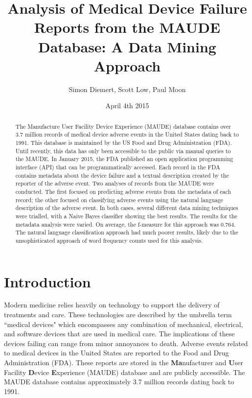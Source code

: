 \documentclass[11pt, notitlepage,abstracton,oneside]{article}   	%
\title{Analysis of Medical Device Failure Reports from the MAUDE Database: A Data Mining Approach}
\author{Simon Diemert, Scott Low, Paul Moon}
\date{April 4th 2015}							%
\begin{document}
\maketitle

\begin{abstract}


\thispagestyle{empty}
The Manufacture User Facility Device Experience (MAUDE) database contains over 3.7 million records of medical device adverse events in the United States dating back to 1991. This database is maintained by the US Food and Drug Administration (FDA). Until recently, this data has only been accessible to the public via manual queries to the MAUDE. In January 2015, the FDA published an open application programming interface (API) that can be programmatically accessed. Each record in the FDA contains metadata about the device failure and a textual description created by the reporter of the adverse event. Two analyses of records from the MAUDE were conducted. The first focused on predicting adverse events from the metadata of each record; the other focused on classifying adverse events using the natural language description of the adverse event. In both cases, several different data mining techniques were trialled, with a Naive Bayes classifier showing the best results. The results for the metadata analysis were varied. On average, the f-measure for this approach was 0.764. The natural language classification approach had much poorer results, likely due to the unsophisticated approach of word frequency counts used for this analysis.
\end{abstract}

\tableofcontents

\clearpage
\newpage
\setcounter{page}{1}
\section{Introduction}
Modern medicine relies heavily on technology to support the delivery of treatments and care. These technologies are described by the umbrella term ``medical devices" which encompasses any combination of mechanical, electrical, and software devices that are used in medical care. The implications of these devices failing can range from minor annoyances to death. Adverse events related to medical devices in the United States are reported to the Food and Drug Administration (FDA). These reports are stored in the \textbf{Ma}nufacturer and \textbf{U}ser Facility \textbf{D}evice \textbf{E}xperience (MAUDE) database and are publicly accessible. The MAUDE database contains approximately 3.7 million records dating back to 1991. 
\end{document}
